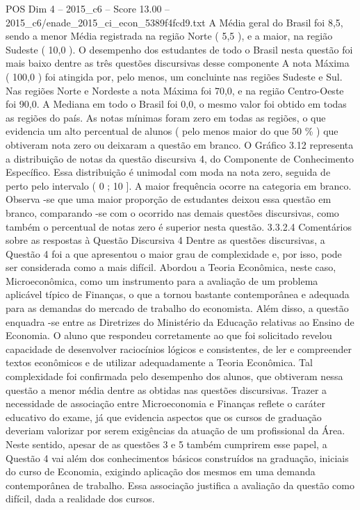 \begin{textsample}{POS Dim 4 – 2015\_c6 – Score 13.00 – 2015\_c6/enade\_2015\_ci\_econ\_5389f4fcd9.txt}
A Média geral do Brasil foi 8,5, sendo a menor Média registrada na região Norte ( 5,5 ), e a maior, na região Sudeste ( 10,0 ).
O desempenho dos estudantes de todo o Brasil nesta questão foi mais baixo dentre as três questões discursivas desse componente A nota Máxima ( 100,0 ) foi atingida por, pelo menos, um concluinte nas regiões Sudeste e Sul.
Nas regiões Norte e Nordeste a nota Máxima foi 70,0, e na região Centro-Oeste foi 90,0.
A Mediana em todo o Brasil foi 0,0, o mesmo valor foi obtido em todas as regiões do país.
As notas mínimas foram zero em todas as regiões, o que evidencia um alto percentual de alunos ( pelo menos maior do que 50 \% ) que obtiveram nota zero ou deixaram a questão em branco.
O Gráfico 3.12 representa a distribuição de notas da questão discursiva 4, do Componente de Conhecimento Específico.
Essa distribuição é unimodal com moda na nota zero, seguida de perto pelo intervalo ( 0 ; 10 ].
A maior frequência ocorre na categoria em branco.
Observa -se que uma maior proporção de estudantes deixou essa questão em branco, comparando -se com o ocorrido nas demais questões discursivas, como também o percentual de notas zero é superior nesta questão. 3.3.2.4 Comentários sobre as respostas à Questão Discursiva 4 Dentre as questões discursivas, a Questão 4 foi a que apresentou o maior grau de complexidade e, por isso, pode ser considerada como a mais difícil.
Abordou a Teoria Econômica, neste caso, Microeconômica, como um instrumento para a avaliação de um problema aplicável típico de Finanças, o que a tornou bastante contemporânea e adequada para as demandas do mercado de trabalho do economista.
Além disso, a questão enquadra -se entre as Diretrizes do Ministério da Educação relativas ao Ensino de Economia.
O aluno que respondeu corretamente ao que foi solicitado revelou capacidade de desenvolver raciocínios lógicos e consistentes, de ler e compreender textos econômicos e de utilizar adequadamente a Teoria Econômica.
Tal complexidade foi confirmada pelo desempenho dos alunos, que obtiveram nessa questão a menor média dentre as obtidas nas questões discursivas.
Trazer a necessidade de associação entre Microeconomia e Finanças reflete o caráter educativo do exame, já que evidencia aspectos que os cursos de graduação deveriam valorizar por serem exigências da atuação de um profissional da Área.
Neste sentido, apesar de as questões 3 e 5 também cumprirem esse papel, a Questão 4 vai além dos conhecimentos básicos construídos na graduação, iniciais do curso de Economia, exigindo aplicação dos mesmos em uma demanda contemporânea de trabalho.
Essa associação justifica a avaliação da questão como difícil, dada a realidade dos cursos.

\end{textsample}
